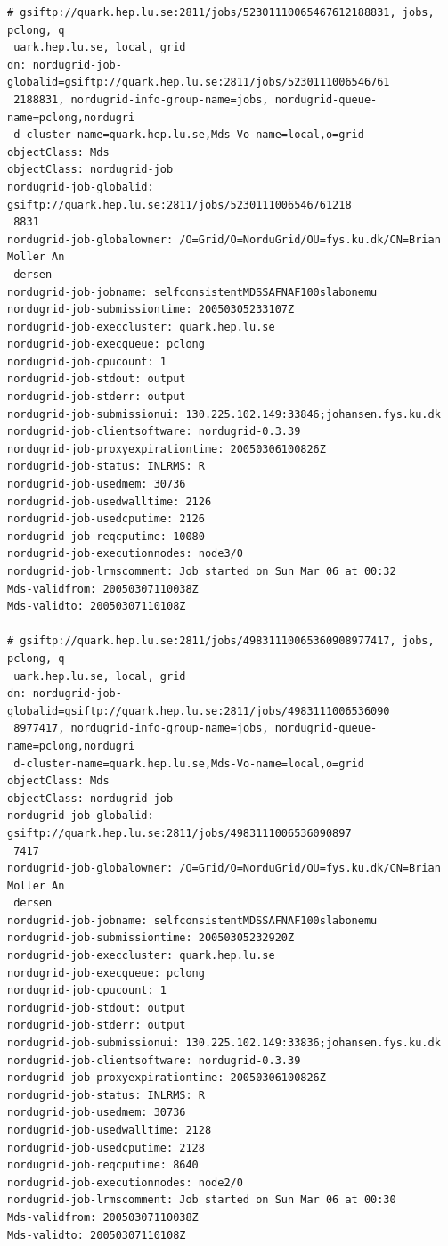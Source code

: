 \documentclass{article}
\begin{document}
\begin{itemize}
\begin{verbatim}
# gsiftp://quark.hep.lu.se:2811/jobs/52301110065467612188831, jobs, pclong, q
 uark.hep.lu.se, local, grid
dn: nordugrid-job-globalid=gsiftp://quark.hep.lu.se:2811/jobs/5230111006546761
 2188831, nordugrid-info-group-name=jobs, nordugrid-queue-name=pclong,nordugri
 d-cluster-name=quark.hep.lu.se,Mds-Vo-name=local,o=grid
objectClass: Mds
objectClass: nordugrid-job
nordugrid-job-globalid: gsiftp://quark.hep.lu.se:2811/jobs/5230111006546761218
 8831
nordugrid-job-globalowner: /O=Grid/O=NorduGrid/OU=fys.ku.dk/CN=Brian Moller An
 dersen
nordugrid-job-jobname: selfconsistentMDSSAFNAF100slabonemu
nordugrid-job-submissiontime: 20050305233107Z
nordugrid-job-execcluster: quark.hep.lu.se
nordugrid-job-execqueue: pclong
nordugrid-job-cpucount: 1
nordugrid-job-stdout: output
nordugrid-job-stderr: output
nordugrid-job-submissionui: 130.225.102.149:33846;johansen.fys.ku.dk
nordugrid-job-clientsoftware: nordugrid-0.3.39
nordugrid-job-proxyexpirationtime: 20050306100826Z
nordugrid-job-status: INLRMS: R
nordugrid-job-usedmem: 30736
nordugrid-job-usedwalltime: 2126
nordugrid-job-usedcputime: 2126
nordugrid-job-reqcputime: 10080
nordugrid-job-executionnodes: node3/0
nordugrid-job-lrmscomment: Job started on Sun Mar 06 at 00:32
Mds-validfrom: 20050307110038Z
Mds-validto: 20050307110108Z

# gsiftp://quark.hep.lu.se:2811/jobs/49831110065360908977417, jobs, pclong, q
 uark.hep.lu.se, local, grid
dn: nordugrid-job-globalid=gsiftp://quark.hep.lu.se:2811/jobs/4983111006536090
 8977417, nordugrid-info-group-name=jobs, nordugrid-queue-name=pclong,nordugri
 d-cluster-name=quark.hep.lu.se,Mds-Vo-name=local,o=grid
objectClass: Mds
objectClass: nordugrid-job
nordugrid-job-globalid: gsiftp://quark.hep.lu.se:2811/jobs/4983111006536090897
 7417
nordugrid-job-globalowner: /O=Grid/O=NorduGrid/OU=fys.ku.dk/CN=Brian Moller An
 dersen
nordugrid-job-jobname: selfconsistentMDSSAFNAF100slabonemu
nordugrid-job-submissiontime: 20050305232920Z
nordugrid-job-execcluster: quark.hep.lu.se
nordugrid-job-execqueue: pclong
nordugrid-job-cpucount: 1
nordugrid-job-stdout: output
nordugrid-job-stderr: output
nordugrid-job-submissionui: 130.225.102.149:33836;johansen.fys.ku.dk
nordugrid-job-clientsoftware: nordugrid-0.3.39
nordugrid-job-proxyexpirationtime: 20050306100826Z
nordugrid-job-status: INLRMS: R
nordugrid-job-usedmem: 30736
nordugrid-job-usedwalltime: 2128
nordugrid-job-usedcputime: 2128
nordugrid-job-reqcputime: 8640
nordugrid-job-executionnodes: node2/0
nordugrid-job-lrmscomment: Job started on Sun Mar 06 at 00:30
Mds-validfrom: 20050307110038Z
Mds-validto: 20050307110108Z


\end{verbatim}
\end{itemize}
\end{document}
